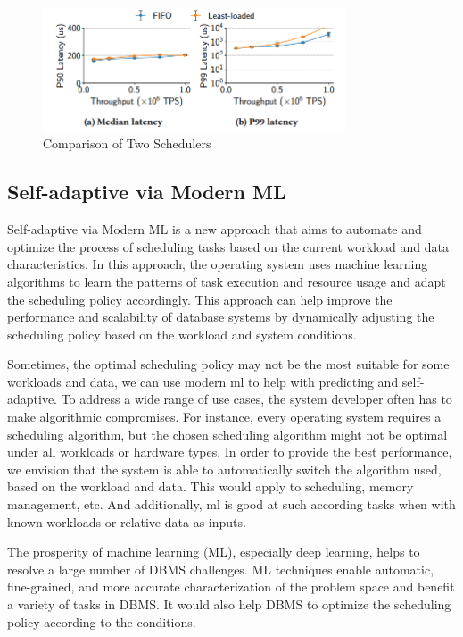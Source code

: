 \documentclass[11pt,a4paper]{article}
\begin{document}
\begin{figure}[h!]
    \centering
    \includegraphics[width=0.8\textwidth]{latency.png}
    \caption{Comparison of Two Schedulers}
\end{figure}

\subsection{Self-adaptive via Modern ML}

Self-adaptive via Modern ML is a new approach that aims to automate and optimize the process of scheduling tasks based on the current workload and data characteristics.
In this approach, the operating system uses machine learning algorithms to learn the patterns of task execution and resource usage and adapt the scheduling policy accordingly.
This approach can help improve the performance and scalability of database systems by dynamically adjusting the scheduling policy based on the workload and system conditions.



Sometimes, the optimal scheduling policy may not be the most suitable for some workloads and data, we can use modern ml to help with predicting and self-adaptive. 
To address a wide range of use cases, the system developer often has to make algorithmic compromises. 
For instance, every operating system requires a scheduling algorithm, but the chosen scheduling algorithm might not be optimal under all workloads or hardware types. 
In order to provide the best performance, we envision that the system is able to automatically switch the algorithm used, based on the workload and data. 
This would apply to scheduling, memory management, etc.\cite{10.1007/978-3-030-71055-2_1}
And additionally, ml is good at such according tasks when with known workloads or relative data as inputs. 

The prosperity of machine learning (ML), especially deep learning, helps to resolve a large number of DBMS challenges.
ML techniques enable automatic, fine-grained, and more accurate characterization of the problem space and benefit a variety of tasks in DBMS.\cite{DBLP:journals/corr/abs-2105-02418}
It would also help DBMS to optimize the scheduling policy according to the conditions.
\end{document}
